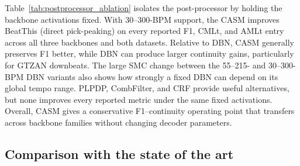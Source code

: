\documentclass{article}
\begin{document}
Table~\ref{tab:postprocessor_ablation} isolates the post-processor by holding the backbone activations fixed. With 30--300-BPM support, the CASM improves BeatThis (direct pick-peaking) on every reported F1, CMLt, and AMLt entry across all three backbones and both datasets. Relative to DBN, CASM generally preserves F1 better, while DBN can produce larger continuity gains, particularly for GTZAN downbeats. The large SMC change between the 55--215- and 30--300-BPM DBN variants also shows how strongly a fixed DBN can depend on its global tempo range. PLPDP, CombFilter, and CRF provide useful alternatives, but none improves every reported metric under the same fixed activations. Overall, CASM gives a conservative F1--continuity operating point that transfers across backbone families without changing decoder parameters.

\subsection{Comparison with the state of the art}
\end{document}
